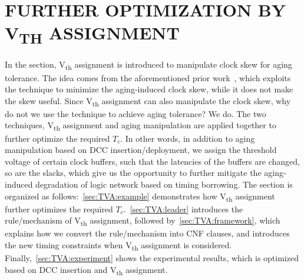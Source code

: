  \section{FURTHER OPTIMIZATION BY V\textsubscript{TH} ASSIGNMENT}
\label{sec:TVA}
In the section, V\textsubscript{th} assignment is introduced to manipulate clock skew for aging tolerance. The idea comes from the aforementioned prior work~\cite{chen2013novel}, which exploits the technique to minimize the aging-induced clock skew, while it does not make the skew useful. Since V\textsubscript{th} assignment can also manipulate the clock skew, why do not we use the technique to achieve aging tolerance? We do. The two techniques,  V\textsubscript{th} assignment and aging manipulation are applied together to further optimize the required $T_c$. In other words, in addition to aging manipulation based on DCC insertion/deployment, we assign the threshold voltage of certain clock buffers, such that the latencies of the buffers are changed, so are the slacks, which give us the opportunity to further mitigate the aging-induced degradation of logic network based on timing borrowing. The section is organized as follows:~\ref{sec:TVA:example} demonstrates how V\textsubscript{th} assignment further optimizes the required $T_c$.~\ref{sec:TVA:leader} introduces the rule/mechanism of V\textsubscript{th} assignment, followed by~\ref{sec:TVA:framework}, which explains how we convert the rule/mechanism into CNF clauses, and  introduces the new timing constraints when V\textsubscript{th} assignment is considered. Finally,~\ref{sec:TVA:experiment} shows the experimental results, which is optimized based on DCC insertion and V\textsubscript{th} assignment.
